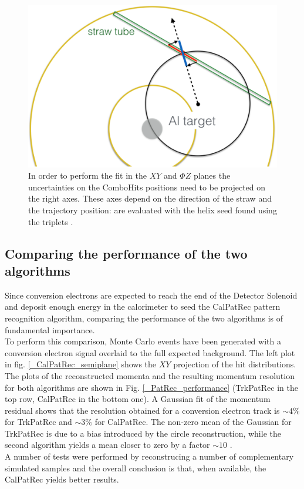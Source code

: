 \documentclass[12pt,a4paper,openright, oneside, titlepage]{book} %
\begin{document}
\begin{figure}[h!]
\centering
\includegraphics[scale=0.3]{giani_TrkPatRec_errors}
\caption[Projection of the uncertainties]{In order to perform the fit in the $XY$ and $\Phi Z$ planes the uncertainties on the ComboHits positions need to be projected on the right axes. 
These axes depend on the direction of the straw and the trajectory position: are evaluated with the helix seed found using the triplets \cite{GianiPatRec:2020}.}
\label{_TrkPatRec_errors}
\end{figure}

\subsection{Comparing the performance of the two algorithms}
Since conversion electrons are expected to reach the end of the Detector Solenoid and deposit enough energy in the calorimeter to seed the CalPatRec pattern recognition algorithm, comparing the performance of the two algorithms is of fundamental importance.\\
To perform this comparison, Monte Carlo events have been generated with a conversion electron signal overlaid to the full expected background\cite{GianiPatRec:2020}.
The left plot in fig. \ref{_CalPatRec_semiplane} shows the $XY$ projection of the hit distributions.
The plots of the reconstructed momenta and the resulting momentum resolution for both algorithms are shown in Fig. \ref{_PatRec_performance} (TrkPatRec in the top row, CalPatRec in the bottom one). 
A Gaussian fit of the momentum residual shows that the resolution obtained for a conversion electron track is $\sim 4\%$ for TrkPatRec and $\sim 3\%$ for CalPatRec. 
The non-zero mean of the Gaussian for TrkPatRec is due to a bias introduced by the circle reconstruction, while the second algorithm yields a mean closer to zero by a factor $\sim 10$  \cite{GianiPatRec:2016} \cite{GianiPatRec:2020}. \\
A number of tests were performed by reconstrucing a number of complementary simulated samples and the overall conclusion is that, when available, the CalPatRec yields better results.
\end{document}
